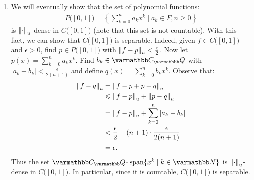\begin{example}
\begin{enumerate}[label = (\arabic*),itemsep=1pt,topsep=3pt]
            \item We will eventually show that the set of polynomial functions:
                \begin{equation*}
                \begin{split}
                    P\bigl([0,1]\bigr) = \left\{ \sum_{k = 0}^n a_kx^k \mid a_k \in F,n \geq 0 \right\}
                \end{split}
                \end{equation*}
            is $\left\lVert \cdot \right\rVert_u$-dense in $C\bigl([0,1]\bigr)$ (note that this set is not countable). With this fact, we can show that $C\bigl([0,1]\bigr)$ is separable. Indeed, given $f \in C\bigl([0,1]\bigr)$ and $\epsilon > 0$, find $p \in P\bigl([0,1]\bigr)$ with $\left\lVert f - p \right\rVert_u < \frac{\epsilon}{2}$. Now let $p(x) = \sum_{k = 0}^n a_k x^k$. Find $b_k \in \bfC_\bfQ$ with $|a_k - b_k| < \frac{\epsilon}{2(n+1)}$ and define $q(x) = \sum_{k = 0}^n b_k x^k$. Observe that:
                \begin{equation*}
                \begin{split}
                    \left\lVert f - q \right\rVert_u
                    & = \left\lVert f-p + p-q \right\rVert_u \\
                    & \leqslant \left\lVert f-p \right\rVert_u + \left\lVert p-q \right\rVert_u \\
                    & = \left\lVert f-p \right\rVert_u + \sum_{k = 0}^n|a_k - b_k| \\
                    & < \frac{\epsilon}{2} + (n+1)\cdot \frac{\epsilon}{2(n+1)} \\
                    & = \epsilon.
                \end{split}
                \end{equation*}
            Thus the set $\bfC_\bfQ\text{\h1-}\Span\{x^k \mid k \in \bfN\}$ is $\left\lVert \cdot \right\rVert_u$-dense in $C\bigl([0,1]\bigr)$. In particular, since it is countable, $C\bigl([0,1]\bigr)$ is separable.
        \end{enumerate}
    \end{example}

    

    \begin{center}
    \end{center}

